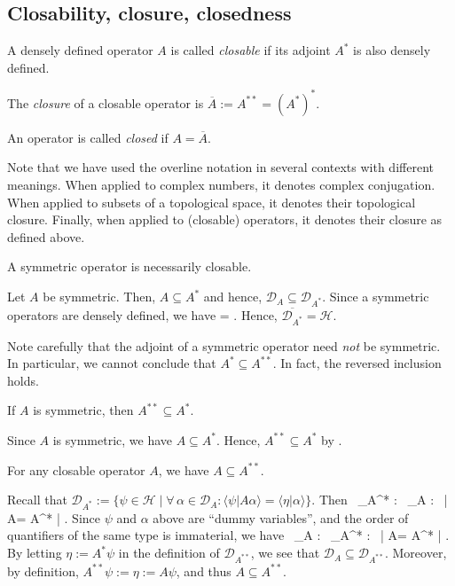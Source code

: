 \subsection{Closability, closure, closedness}


\bd
\ben[label=(\roman*)]
\item A densely defined operator $A$ is called \emph{closable} if its adjoint $A^*$ is also densely defined.
\item The \emph{closure} of a closable operator is $\overline{A}:=A^{**}=(A^*)^*$.
\item An operator is called \emph{closed} if $A=\overline{A}$.
\een
\ed

\br
Note that we have used the overline notation in several contexts with different meanings. When applied to complex numbers, it denotes complex conjugation. When applied to subsets of a topological space, it denotes their topological closure. Finally, when applied to (closable) operators, it denotes their closure as defined above.
\er

\bp
A symmetric operator is necessarily closable.
\ep

\bq
Let $A$ be symmetric. Then, $A\subseteq A^*$ and hence, $\mathcal{D}_A\subseteq \mathcal{D}_{A^*}$. Since a symmetric operators are densely defined, we have
\bse
{}=\subseteq {} \subseteq {}.
\ese
Hence, $\overline{\mathcal{D}_{A^*}} = \mathcal{H}$.
\eq

Note carefully that the adjoint of a symmetric operator need \emph{not} be symmetric. In particular, we cannot conclude that $A^*\subseteq A^{**}$. In fact, the reversed inclusion holds.

\bp
If $A$ is symmetric, then $A^{**}\subseteq A^*$.
\ep

\bq
Since $A$ is symmetric, we have $A\subseteq A^*$. Hence, $A^{**}\subseteq A^*$ by .
\eq

\bl
\label{lem:closableext}
For any closable operator $A$, we have $A\subseteq A^{**}$.
\el

\bq
Recall that $\mathcal{D}_{A^*}:=\{\psi\in \mathcal{H}\mid \forall\, \alpha\in \mathcal{D}_{A} : \langle \psi | A\alpha \rangle=\langle \eta | \alpha \rangle\}$. Then
\bse
\forall \, \psi \in{}_{A^*} : \forall \, \alpha \in {}_{A} : \  \langle \psi | A\alpha \rangle =  \langle A^* \psi | \alpha \rangle.
\ese
Since $\psi$ and $\alpha$ above are ``dummy variables'', and the order of quantifiers of the same type is immaterial, we have
\bse
\forall \, \psi \in{}_{A} : \forall \, \alpha \in {}_{A^*} : \  \langle \alpha | A\psi \rangle =  \langle A^* \alpha | \psi \rangle.
\ese
By letting $\eta:=A^*\psi$ in the definition of $\mathcal{D}_{A^{**}}$, we see that $\mathcal{D}_{A}\subseteq\mathcal{D}_{A^{**}}$. Moreover, by definition, $A^{**}\psi:=\eta := A\psi$, and thus $A\subseteq A^{**}$.
\eq

